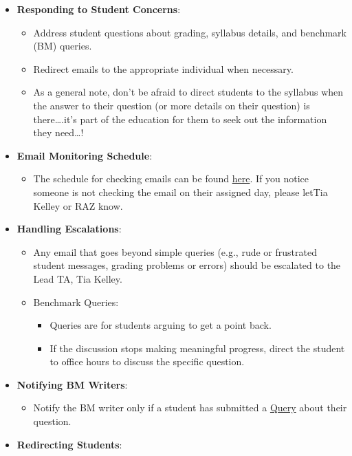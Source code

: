 \documentclass[
]{article}
\providecommand{\tightlist}{%
  \setlength{\itemsep}{0pt}\setlength{\parskip}{0pt}}
\begin{document}
\begin{itemize}
\tightlist
\item
  \textbf{Responding to Student Concerns}:

  \begin{itemize}
  \tightlist
  \item
    Address student questions about grading, syllabus details, and benchmark (BM) queries.
  \item
    Redirect emails to the appropriate individual when necessary.
  \item
    As a general note, don't be afraid to direct students to the syllabus when the answer to their question (or more details on their question) is there\ldots.it's part of the education for them to seek out the information they need\ldots!
  \end{itemize}
\item
  \textbf{Email Monitoring Schedule}:

  \begin{itemize}
  \tightlist
  \item
    The schedule for checking emails can be found \href{https://docs.google.com/spreadsheets/d/1AXT7fqusvnTBZrsaOuhRgZOQ4EmFNt0YmXQNxuAznls/edit?usp=sharing}{here}. If you notice someone is not checking the email on their assigned day, please letTia Kelley or RAZ know.
  \end{itemize}
\item
  \textbf{Handling Escalations}:

  \begin{itemize}
  \tightlist
  \item
    Any email that goes beyond simple queries (e.g., rude or frustrated student messages, grading problems or errors) should be escalated to the Lead TA, Tia Kelley.
  \item
    Benchmark Queries:

    \begin{itemize}
    \tightlist
    \item
      Queries are for students arguing to get a point back.
    \item
      If the discussion stops making meaningful progress, direct the student to office hours to discuss the specific question.
    \end{itemize}
  \end{itemize}
\item
  \textbf{Notifying BM Writers}:

  \begin{itemize}
  \tightlist
  \item
    Notify the BM writer only if a student has submitted a \protect\hyperlink{benchmark-queries}{Query} about their question.
  \end{itemize}
\item
  \textbf{Redirecting Students}:


\end{itemize}
\end{document}
